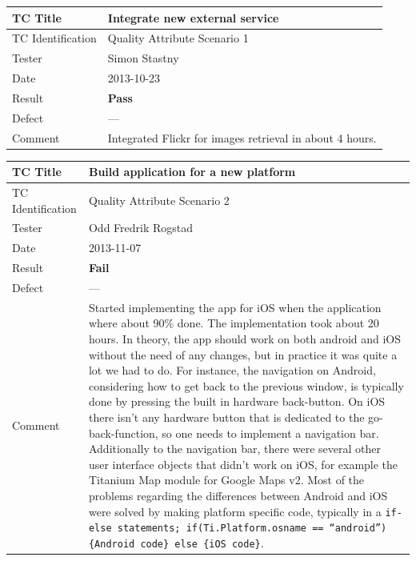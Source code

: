 \documentclass[11pt]{book}
\begin{document}
\begin{center}\begin{tabular}{| l | p{11cm} |} \hline
    TC Title          & Integrate new external service            \\ \hline 
    TC Identification & Quality Attribute Scenario 1              \\ \hline 
    Tester            & Simon Stastny                             \\ \hline 
    Date              & 2013-10-23                                \\ \hline 
    Result            & \textbf{Pass}                             \\ \hline 
    Defect            & ---                                       \\ \hline 
    Comment           & Integrated Flickr for images retrieval
                        in about 4 hours.                         \\
  \hline 
\end{tabular}\end{center}

\begin{center}\begin{tabular}{| l | p{11cm} |} \hline
    TC Title          & Build application for a new platform      \\ \hline 
    TC Identification & Quality Attribute Scenario 2              \\ \hline 
    Tester            & Odd Fredrik Rogstad                       \\ \hline 
    Date              & 2013-11-07                                \\ \hline 
    Result            & \textbf{Fail}                             \\ \hline 
    Defect            & ---                                       \\ \hline 
    Comment           & Started implementing the app for iOS when the application where about 90\% done. The implementation took about 20 hours. In theory, the app should work on both android and iOS without the need of any changes, but in practice it was quite a lot we had to do. For instance, the navigation on Android, considering how to get back to the previous window, is typically done by pressing the built in hardware back-button. On iOS there isn't any hardware button that is dedicated to the go-back-function, so one needs to implement a navigation bar. Additionally to the navigation bar, there were several other user interface objects that didn't work on iOS, for example the Titanium Map module for Google Maps v2. Most of the problems regarding the differences between Android and iOS were solved by making platform specific code, typically in a \texttt{if-else statements; if(Ti.Platform.osname == “android”)\{Android code\} else \{iOS code\}}.                                          \\
  \hline 
\end{tabular}\end{center}
\end{document}
